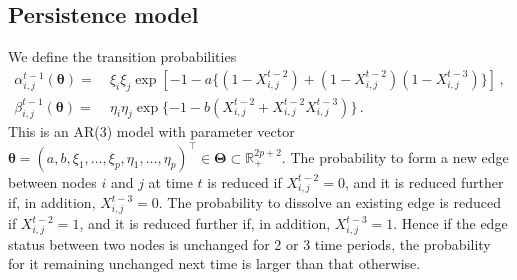 \documentclass[12pt]{article}
\newcommand{\bTheta}{\boldsymbol \Theta}
\newcommand{\btheta}{\boldsymbol \theta}
\def\T{{\scriptscriptstyle \top} }
\newcommand{\0}{{\bf 0}}
\begin{document}
\subsection{Persistence model} \label{sec:persistence}
We define the transition probabilities %
\begin{equation} \label{eq:persistence}
\begin{split}
    \alpha_{i,j}^{t-1}(\btheta)=&~ \xi_i \xi_j  \exp [-  1 - a\{ (1-X_{i,j}^{t-2}) +(1-X_{i,j}^{t-2})(1-X_{i,j}^{t-3}) \} ]\,,\\  
    \beta_{i,j}^{t-1}(\btheta) = &~ \eta_i \eta_j \exp \{-  1 - b( X_{i,j}^{t-2}+X_{i,j}^{t-2}  X_{i,j}^{t-3})\} \,. 
    \end{split}
\end{equation}
This is an AR(3) model with parameter vector $\btheta = (a, b, \xi_1, \ldots, \xi_p,
\eta_1, \ldots, \eta_p)^{\T}\in\bTheta\subset\mathbb{R}_+^{2p+2}$. %
The probability to form a new edge between nodes $i$ and $j$ at time $t$ is reduced if $X_{i,j}^{t-2} =0$, and it is reduced further if, in addition, $X_{i,j}^{t-3}=0$. 
The probability to dissolve an existing edge is reduced if
$X_{i,j}^{t-2} =1$, and it is reduced further if, in addition, $X_{i,j}^{t-3}=1$. Hence if the edge status between two nodes is unchanged for 2 or 3 time periods, the probability for it remaining unchanged next time is larger than that otherwise. 
\end{document}
